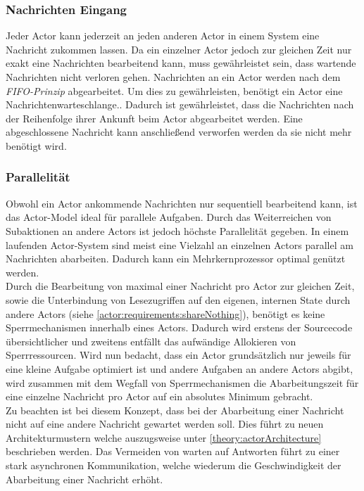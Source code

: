 \subsubsection{Nachrichten Eingang}\label{actor:Mailbox}
Jeder Actor kann jederzeit an jeden anderen Actor in einem System eine Nachricht zukommen lassen. Da ein einzelner Actor jedoch zur gleichen Zeit nur exakt eine Nachrichten bearbeitend kann, muss gewährleistet sein, dass wartende Nachrichten nicht verloren gehen. Nachrichten an ein Actor werden nach dem \textit{FIFO-Prinzip} abgearbeitet. 
 Um dies zu gewährleisten, benötigt ein Actor eine Nachrichtenwarteschlange.\citep{Agha1985ActorsSystems}.  Dadurch ist gewährleistet, dass die Nachrichten nach der Reihenfolge ihrer Ankunft beim Actor abgearbeitet werden. Eine abgeschlossene Nachricht kann anschließend verworfen werden da sie nicht mehr benötigt wird. 

\subsubsection{Parallelität}\label{actor:parallelism}
Obwohl ein Actor ankommende Nachrichten nur sequentiell bearbeitend kann, ist das Actor-Model ideal für parallele Aufgaben.\citep{hewitt1973session} Durch das Weiterreichen von Subaktionen an andere Actors ist jedoch höchste Parallelität gegeben. In einem laufenden Actor-System sind meist eine Vielzahl an einzelnen Actors parallel am Nachrichten abarbeiten. Dadurch kann ein Mehrkernprozessor optimal genützt werden. \citep{Agha1985ActorsSystems} \\
Durch die Bearbeitung von maximal einer Nachricht pro Actor zur gleichen Zeit, sowie die Unterbindung von Lesezugriffen auf den eigenen, internen State durch andere Actors (siehe \ref{actor:requirements:shareNothing}), benötigt es keine Sperrmechanismen innerhalb eines Actors. Dadurch wird erstens der Sourcecode übersichtlicher und zweitens entfällt das aufwändige Allokieren von Sperrressourcen.\citep{Vernon2015ReactiveAkka}
Wird nun bedacht, dass ein Actor grundsätzlich nur jeweils für eine kleine Aufgabe optimiert ist und andere Aufgaben an andere Actors abgibt, wird zusammen mit dem Wegfall von Sperrmechanismen die Abarbeitungszeit für eine einzelne Nachricht pro Actor auf ein absolutes Minimum gebracht. \citep{Vernon2015ReactiveAkka} \\
Zu beachten ist bei diesem Konzept, dass bei der Abarbeitung einer Nachricht nicht auf eine andere Nachricht gewartet werden soll. Dies führt zu neuen Architekturmustern welche auszugsweise unter \ref{theory:actorArchitecture} beschrieben werden. Das Vermeiden von warten auf Antworten führt zu einer stark asynchronen Kommunikation, welche wiederum die Geschwindigkeit der Abarbeitung einer Nachricht erhöht.

